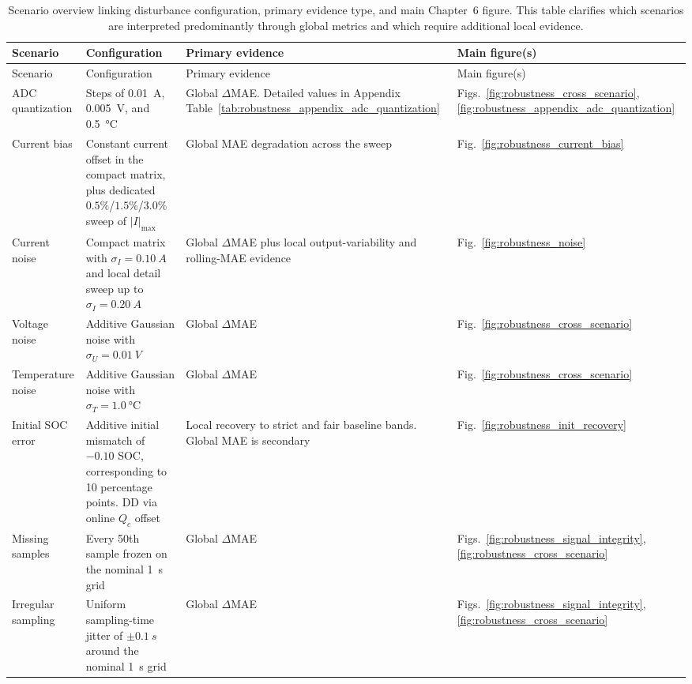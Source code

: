 \documentclass[
    a4paper,
    12pt,
    titlepage,
    bibliography=totoc,
    twoside=on,
    parskip=false,
    numbers=noenddot,
    cleardoublepage=empty,
    DIV=12,
    BCOR=12.0mm,
    headheight=36pt,
    headings=openright
]{scrreprt}
\begin{document}
\begingroup\small
\begin{longtable}{>{\raggedright\arraybackslash}p{2.2cm}>{\raggedright\arraybackslash}p{3.6cm}>{\raggedright\arraybackslash}p{4.4cm}>{\raggedright\arraybackslash}p{3.0cm}}
\caption[Robustness scenario evidence map.]{Scenario overview linking disturbance configuration, primary evidence type, and main Chapter~6 figure. This table clarifies which scenarios are interpreted predominantly through global metrics and which require additional local evidence.}\label{tab:robustness_appendix_scenario_overview}\\
\toprule
Scenario & Configuration & Primary evidence & Main figure(s) \\
\midrule
\endfirsthead
\toprule
Scenario & Configuration & Primary evidence & Main figure(s) \\
\midrule
\endhead
ADC quantization & Steps of \SI{0.01}{A}, \SI{0.005}{V}, and \SI{0.5}{\celsius} & Global $\Delta$MAE. Detailed values in Appendix Table~\ref{tab:robustness_appendix_adc_quantization} & Figs.~\ref{fig:robustness_cross_scenario}, \ref{fig:robustness_appendix_adc_quantization} \\
Current bias & Constant current offset in the compact matrix, plus dedicated $0.5\%$/$1.5\%$/$3.0\%$ sweep of $|I|_{\max}$ & Global MAE degradation across the sweep & Fig.~\ref{fig:robustness_current_bias} \\
Current noise & Compact matrix with $\sigma_I=\SI{0.10}{A}$ and local detail sweep up to $\sigma_I=\SI{0.20}{A}$ & Global $\Delta$MAE plus local output-variability and rolling-MAE evidence & Fig.~\ref{fig:robustness_noise} \\
Voltage noise & Additive Gaussian noise with $\sigma_U=\SI{0.01}{V}$ & Global $\Delta$MAE & Fig.~\ref{fig:robustness_cross_scenario} \\
Temperature noise & Additive Gaussian noise with $\sigma_T=\SI{1.0}{\celsius}$ & Global $\Delta$MAE & Fig.~\ref{fig:robustness_cross_scenario} \\
Initial SOC error & Additive initial mismatch of $-0.10$ SOC, corresponding to 10 percentage points. DD via online $Q_c$ offset & Local recovery to strict and fair baseline bands. Global MAE is secondary & Fig.~\ref{fig:robustness_init_recovery} \\
Missing samples & Every 50th sample frozen on the nominal \SI{1}{s} grid & Global $\Delta$MAE & Figs.~\ref{fig:robustness_signal_integrity}, \ref{fig:robustness_cross_scenario} \\
Irregular sampling & Uniform sampling-time jitter of $\pm\SI{0.1}{s}$ around the nominal \SI{1}{s} grid & Global $\Delta$MAE & Figs.~\ref{fig:robustness_signal_integrity}, \ref{fig:robustness_cross_scenario} \\

\end{longtable}
\end{document}
